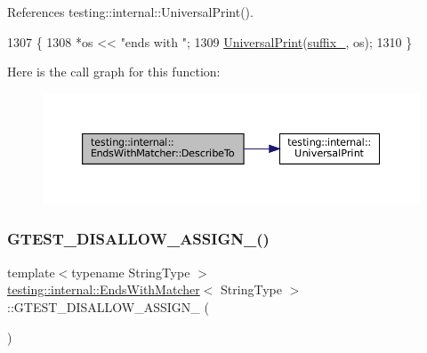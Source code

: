 References testing\+::internal\+::\+Universal\+Print().


\begin{DoxyCode}
1307                                         \{
1308     *os << \textcolor{stringliteral}{"ends with "};
1309     \hyperlink{namespacetesting_1_1internal_a30708fa2bacf11895b03bdb21eb72309}{UniversalPrint}(\hyperlink{classtesting_1_1internal_1_1EndsWithMatcher_a66f75082cf1041cd328c01b47acf8350}{suffix\_}, os);
1310   \}
\end{DoxyCode}
Here is the call graph for this function\+:
\nopagebreak
\begin{figure}[H]
\begin{center}
\leavevmode
\includegraphics[width=350pt]{classtesting_1_1internal_1_1EndsWithMatcher_aec33451ab09428a97ab0793e332416d8_cgraph}
\end{center}
\end{figure}
\mbox{\label{classtesting_1_1internal_1_1EndsWithMatcher_ac220c32e72e0dec1b9d65dc52241acd2}} 
\subsubsection{\texorpdfstring{G\+T\+E\+S\+T\+\_\+\+D\+I\+S\+A\+L\+L\+O\+W\+\_\+\+A\+S\+S\+I\+G\+N\+\_\+()}{GTEST\_DISALLOW\_ASSIGN\_()}}
{\footnotesize\ttfamily template$<$typename String\+Type $>$ \\
\hyperlink{classtesting_1_1internal_1_1EndsWithMatcher}{testing\+::internal\+::\+Ends\+With\+Matcher}$<$ String\+Type $>$\+::G\+T\+E\+S\+T\+\_\+\+D\+I\+S\+A\+L\+L\+O\+W\+\_\+\+A\+S\+S\+I\+G\+N\+\_\+ (\begin{DoxyParamCaption}\item[{\hyperlink{classtesting_1_1internal_1_1EndsWithMatcher}{Ends\+With\+Matcher}$<$ String\+Type $>$}]{ }\end{DoxyParamCaption})\hspace{0.3cm}{\ttfamily [private]}}

